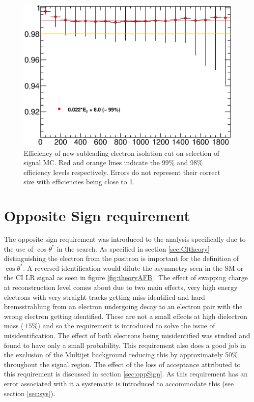    \begin{figure}[h!]
      \begin{center}
      \includegraphics[scale=0.6]{images/C5_sub_iso_efficiency.eps}
      \end{center}
   \caption{Efficiency of new subleading electron isolation cut on selection of signal MC. Red and orange lines indicate the 99\% and 98\% efficiency levels respectively. Errors do not represent their correct size with efficiencies being close to 1.}
   \label{fig:C5_sub_iso_efficiency}
   \end{figure}



\section{Opposite Sign requirement}

   The opposite sign requirement was introduced to the analysis specifically due to the use of $\cos{\theta^{*}}$ in the search. As specified in section \ref{sec:CItheory} distinguishing the electron from the positron is important for the definition of $\cos{\theta^{*}}$. A reversed identification would dilute the asymmetry seen in the SM or the CI LR signal as seen in figure \ref{fig:theoryAFB}. The effect of swapping charge at reconstruction level comes about due to two main effects, very high energy electrons with very straight tracks getting miss identified and hard bremsstrahlung from an electron undergoing decay to an electron pair with the wrong electron getting identified. These are not a small effects at high dielectron mass ($~ 15\%$) and so the requirement is introduced to solve the issue of misidentification. The effect of both electrons being misidentified was studied and found to have only a small probability. This requirement also does a good job in the exclusion of the Multijet background reducing this by approximately 50\% throughout the signal region. The effect of the loss of acceptance attributed to this requirement is discussed in section \ref{sec:oppSign}. As this requirement has an error associated with it a systematic is introduced to accommodate this (see section \ref{sec:sys}). 



